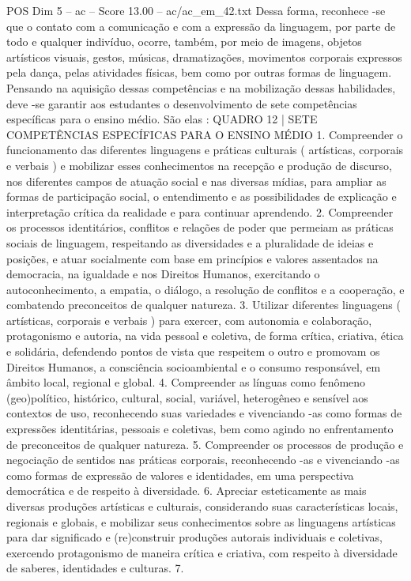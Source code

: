 \begin{textsample}{POS Dim 5 – ac – Score 13.00 – ac/ac\_em\_42.txt}
Dessa forma, reconhece -se que o contato com a comunicação e com a expressão da linguagem, por parte de todo e qualquer indivíduo, ocorre, também, por meio de imagens, objetos artísticos visuais, gestos, músicas, dramatizações, movimentos corporais expressos pela dança, pelas atividades físicas, bem como por outras formas de linguagem.
Pensando na aquisição dessas competências e na mobilização dessas habilidades, deve -se garantir aos estudantes o desenvolvimento de sete competências específicas para o ensino médio.
São elas : QUADRO 12 | SETE COMPETÊNCIAS ESPECÍFICAS PARA O ENSINO MÉDIO 1.
Compreender o funcionamento das diferentes linguagens e práticas culturais ( artísticas, corporais e verbais ) e mobilizar esses conhecimentos na recepção e produção de discurso, nos diferentes campos de atuação social e nas diversas mídias, para ampliar as formas de participação social, o entendimento e as possibilidades de explicação e interpretação crítica da realidade e para continuar aprendendo. 2.
Compreender os processos identitários, conflitos e relações de poder que permeiam as práticas sociais de linguagem, respeitando as diversidades e a pluralidade de ideias e posições, e atuar socialmente com base em princípios e valores assentados na democracia, na igualdade e nos Direitos Humanos, exercitando o autoconhecimento, a empatia, o diálogo, a resolução de conflitos e a cooperação, e combatendo preconceitos de qualquer natureza. 3.
Utilizar diferentes linguagens ( artísticas, corporais e verbais ) para exercer, com autonomia e colaboração, protagonismo e autoria, na vida pessoal e coletiva, de forma crítica, criativa, ética e solidária, defendendo pontos de vista que respeitem o outro e promovam os Direitos Humanos, a consciência socioambiental e o consumo responsável, em âmbito local, regional e global. 4.
Compreender as línguas como fenômeno (geo)político, histórico, cultural, social, variável, heterogêneo e sensível aos contextos de uso, reconhecendo suas variedades e vivenciando -as como formas de expressões identitárias, pessoais e coletivas, bem como agindo no enfrentamento de preconceitos de qualquer natureza. 5.
Compreender os processos de produção e negociação de sentidos nas práticas corporais, reconhecendo -as e vivenciando -as como formas de expressão de valores e identidades, em uma perspectiva democrática e de respeito à diversidade. 6.
Apreciar esteticamente as mais diversas produções artísticas e culturais, considerando suas características locais, regionais e globais, e mobilizar seus conhecimentos sobre as linguagens artísticas para dar significado e (re)construir produções autorais individuais e coletivas, exercendo protagonismo de maneira crítica e criativa, com respeito à diversidade de saberes, identidades e culturas. 7.

\end{textsample}

